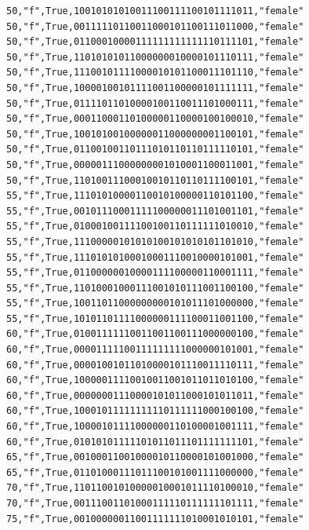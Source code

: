 \documentclass[authoryearcitations]{UoYCSproject}
\begin{document}
\begin{framed}
\begin{verbatim}
50,"f",True,10010101010011100111100101111011,"female"
50,"f",True,00111110110011000101100111011000,"female"
50,"f",True,01100010000111111111111110111101,"female"
50,"f",True,11010101011000000010000101110111,"female"
50,"f",True,11100101111000010101100011101110,"female"
50,"f",True,10000100101111001100000101111111,"female"
50,"f",True,01111011010000100110011101000111,"female"
50,"f",True,00011000110100000110000100100010,"female"
50,"f",True,10010100100000011000000001100101,"female"
50,"f",True,01100100110111010110110111110101,"female"
50,"f",True,00000111000000001010001100011001,"female"
50,"f",True,11010011100010010110110111100101,"female"
55,"f",True,11101010000110010100000110101100,"female"
55,"f",True,00101110001111100000011101001101,"female"
55,"f",True,01000100111100100110111111010010,"female"
55,"f",True,11100000101010100101010101101010,"female"
55,"f",True,11101010100010001110010000101001,"female"
55,"f",True,01100000010000111100000110001111,"female"
55,"f",True,11010001000111001010111001100100,"female"
55,"f",True,10011011000000000101011101000000,"female"
55,"f",True,10101101111000000111100011001100,"female"
60,"f",True,01001111110011001100111000000100,"female"
60,"f",True,00001111100111111111000000101001,"female"
60,"f",True,00001001011010000101110011110111,"female"
60,"f",True,10000011110010011001011011010100,"female"
60,"f",True,00000001110000101011000101011011,"female"
60,"f",True,10001011111111110111111000100100,"female"
60,"f",True,10000101111000000110100001001111,"female"
60,"f",True,01010101111101011011101111111101,"female"
65,"f",True,00100011001000010110000101001000,"female"
65,"f",True,01101000111011100101001111000000,"female"
70,"f",True,11011001010000010001011110100010,"female"
70,"f",True,00111001101000111110111111101111,"female"
75,"f",True,00100000011001111111010001010101,"female"
\end{verbatim}
\end{framed}
\end{document}
